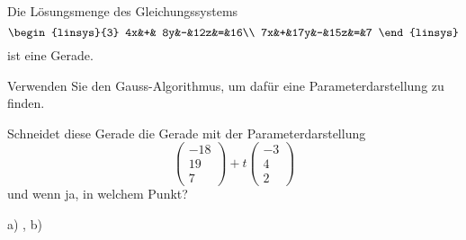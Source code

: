 Die Lösungsmenge des Gleichungssystems 
\[
\begin{linsys}{3}
4x&+& 8y&-&12z&=&16\\
7x&+&17y&-&15z&=&7
\end{linsys}
\]
ist eine Gerade.
\begin{teilaufgaben}
\item
Verwenden Sie den Gauss-Algorithmus, um dafür eine Parameterdarstellung
zu finden.
\item
Schneidet diese Gerade die Gerade mit der Parameterdarstellung
\[
\begin{pmatrix}
-18\\
 19\\
  7
\end{pmatrix}
+t
\begin{pmatrix}
-3\\
 4\\
 2
\end{pmatrix}
\]
und wenn ja, in welchem Punkt?
\end{teilaufgaben}

\begin{hinweis}
a) ,
b) 
\end{hinweis}


